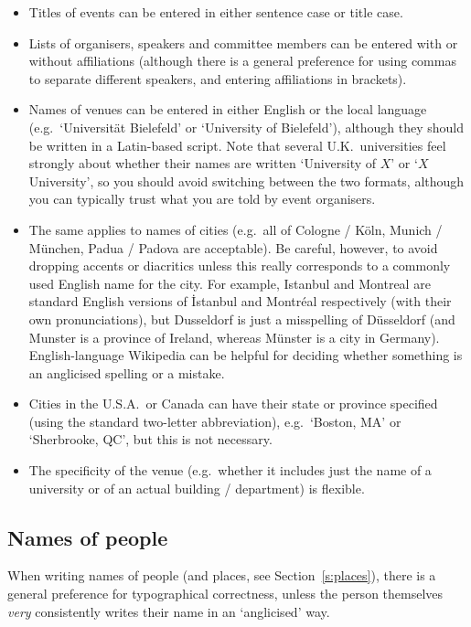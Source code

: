 \documentclass[12pt]{scrartcl}
\theoremstyle{definition}
\begin{document}
\begin{itemize}
\item Titles of events can be entered in either sentence case or title case.
\item Lists of organisers, speakers and committee members can be entered with or without affiliations (although there is a general preference for using commas to separate different speakers, and entering affiliations in brackets).
\item Names of venues can be entered in either English or the local language (e.g.\ `Universität Bielefeld' or `University of Bielefeld'), although they should be written in a Latin-based script. Note that several U.K.\ universities feel strongly about whether their names are written `University of $X$' or `$X$ University', so you should avoid switching between the two formats, although you can typically trust what you are told by event organisers.
\item The same applies to names of cities (e.g.\ all of Cologne / Köln, Munich / München, Padua / Padova are acceptable).
Be careful, however, to avoid dropping accents or diacritics unless this really corresponds to a commonly used English name for the city.
For example, Istanbul and Montreal are standard English versions of İstanbul and Montréal respectively (with their own pronunciations), but Dusseldorf is just a misspelling of Düsseldorf (and Munster is a province of Ireland, whereas Münster is a city in Germany).
English-language Wikipedia can be helpful for deciding whether something is an anglicised spelling or a mistake.
\item Cities in the U.S.A.\ or Canada can have their state or province specified (using the standard two-letter abbreviation), e.g.\ `Boston, MA' or `Sherbrooke, QC', but this is not necessary.
\item The specificity of the venue (e.g.\ whether it includes just the name of a university or of an actual building / department) is flexible.
\end{itemize}

\subsection{Names of people}
\label{s:people}
When writing names of people (and places, see Section~\ref{s:places}), there is a general preference for typographical correctness, unless the person themselves \emph{very} consistently writes their name in an `anglicised' way.
\end{document}
